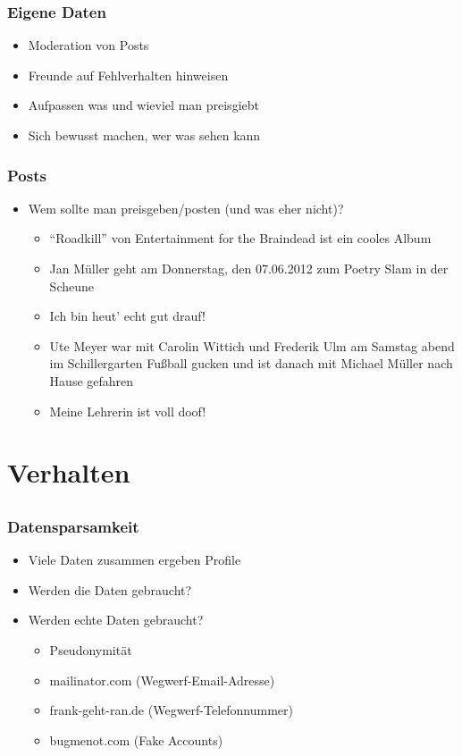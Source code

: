 \documentclass[12pt]{beamer}
\begin{document}
\begin{frame}
  \frametitle{Eigene Daten}
    \begin{itemize}
      \item<2->Moderation von Posts
      \item<3->Freunde auf Fehlverhalten hinweisen
      \item<4->Aufpassen was und wieviel man preisgiebt
      \item<5->Sich bewusst machen, wer was sehen kann
    \end{itemize}
\end{frame}

\begin{frame}
  \frametitle{Posts}
  \begin{itemize}
    \item Wem sollte man preisgeben/posten (und was eher nicht)?
      \begin{itemize}
        \item<2-> "`Roadkill"' von Entertainment for the Braindead ist ein cooles Album
        \item<3-> Jan Müller geht am Donnerstag, den 07.06.2012 zum Poetry Slam in der Scheune
        \item<4-> Ich bin heut' echt gut drauf!
        \item<5-> Ute Meyer war mit Carolin Wittich und Frederik Ulm am Samstag abend im Schillergarten Fußball gucken und ist danach mit Michael Müller nach Hause gefahren
        \item<6-> Meine Lehrerin ist voll doof!
      \end{itemize}
  \end{itemize}
\end{frame}

\section{Verhalten}
\subsection{}

\begin{frame}
    \frametitle{Datensparsamkeit}
    \begin{itemize}
        \item<2-> Viele Daten zusammen ergeben Profile
        \item<3-> Werden die Daten gebraucht?
        \item<4-> Werden echte Daten gebraucht?
            \begin{itemize}
              \item<5-> Pseudonymität
              \item<6-> mailinator.com (Wegwerf-Email-Adresse)
	      \item<7-> frank-geht-ran.de (Wegwerf-Telefonnummer)
              \item<8-> bugmenot.com (Fake Accounts)
            \end{itemize}
    \end{itemize}
\end{frame}
\end{document}

